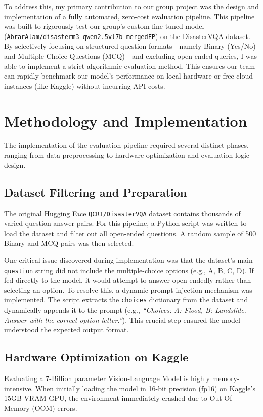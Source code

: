 \documentclass[conference]{IEEEtran}
\begin{document}
To address this, my primary contribution to our group project was the design and implementation of a fully automated, zero-cost evaluation pipeline. This pipeline was built to rigorously test our group's custom fine-tuned model (\texttt{AbrarAlam/disasterm3-qwen2.5vl7b-mergedFP}) on the DisasterVQA dataset. By selectively focusing on structured question formats—namely Binary (Yes/No) and Multiple-Choice Questions (MCQ)—and excluding open-ended queries, I was able to implement a strict algorithmic evaluation method. This ensures our team can rapidly benchmark our model's performance on local hardware or free cloud instances (like Kaggle) without incurring API costs.

\section{Methodology and Implementation}
The implementation of the evaluation pipeline required several distinct phases, ranging from data preprocessing to hardware optimization and evaluation logic design.

\subsection{Dataset Filtering and Preparation}
The original Hugging Face \texttt{QCRI/DisasterVQA} dataset contains thousands of varied question-answer pairs. For this pipeline, a Python script was written to load the dataset and filter out all open-ended questions. A random sample of 500 Binary and MCQ pairs was then selected. 

One critical issue discovered during implementation was that the dataset's main \texttt{question} string did not include the multiple-choice options (e.g., A, B, C, D). If fed directly to the model, it would attempt to answer open-endedly rather than selecting an option. To resolve this, a dynamic prompt injection mechanism was implemented. The script extracts the \texttt{choices} dictionary from the dataset and dynamically appends it to the prompt (e.g., \textit{``Choices: A: Flood, B: Landslide. Answer with the correct option letter.''}). This crucial step ensured the model understood the expected output format.

\subsection{Hardware Optimization on Kaggle}
Evaluating a 7-Billion parameter Vision-Language Model is highly memory-intensive. When initially loading the model in 16-bit precision (fp16) on Kaggle's 15GB VRAM GPU, the environment immediately crashed due to Out-Of-Memory (OOM) errors. 
\end{document}
